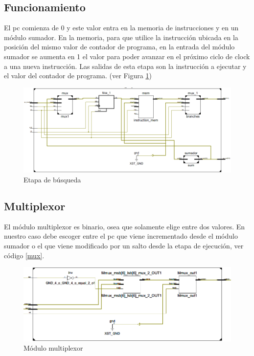 \subsection{Funcionamiento}
El \ac{pc} comienza de 0 y este valor entra en la memoria de instrucciones y en un m\'odulo sumador. En la memoria, para que utilice la instrucci\'on ubicada en la posici\'on del mismo valor de contador de programa, en la entrada del m\'odulo sumador se aumenta en 1 el valor para poder avanzar en el pr\'oximo ciclo de clock a una nueva instrucci\'on. Las salidas de esta etapa son la instrucci\'on a ejecutar y el valor del contador de programa.  (ver Figura \ref{fig:fetchzoom})

\begin{figure}[H]
\centering
\includegraphics[scale=0.35]{Capitulo01/etapafetchzoom}
\caption{Etapa de búsqueda}
\label{fig:fetchzoom}
\end{figure}

\subsection{Multiplexor}

El módulo multiplexor es binario, osea que solamente elige entre dos valores. En nuestro caso debe escoger entre el \ac{pc} que viene incrementado desde el m\'odulo sumador o el que viene modificado por un salto desde la etapa de ejecución, ver código \ref{mux}. 

\begin{figure}[H]
\centering
\includegraphics[scale=0.4]{Capitulo01/mux_fig.png}
\caption{M\'odulo multiplexor}
\label{fig:muxmodule}
\end{figure}

